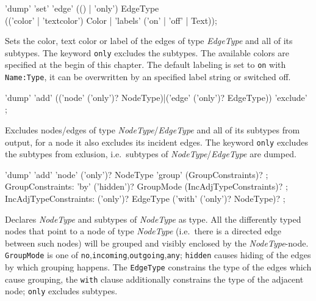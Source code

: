 \begin{rail}
  'dump' 'set' 'edge' (() | 'only') EdgeType \\ (('color' | 'textcolor') Color | 'labels' ('on' | 'off' | Text));
\end{rail}
Sets the color, text color or label of the edges of type \emph{EdgeType} and all of its subtypes.
The keyword \texttt{only} excludes the subtypes. The available colors are specified at the begin of this chapter.
The default labeling is set to \texttt{on} with \texttt{Name:Type}, it can be overwritten by an specified label string or switched off.

\begin{rail}
  'dump' 'add' (('node' ('only')? NodeType)|('edge' ('only')? EdgeType)) 'exclude' ;
\end{rail}
Excludes nodes/edges of type \emph{NodeType}/\emph{EdgeType} and all of its subtypes from output, for a node it also excludes its incident edges.
The keyword \texttt{only} excludes the subtypes from exlusion, i.e.\ subtypes of \emph{NodeType}/\emph{EdgeType} are dumped.

\begin{rail}
  'dump' 'add' 'node' ('only')? NodeType 'group' (GroupConstraints)? ;
GroupConstraints:
  'by' ('hidden')? GroupMode (IncAdjTypeConstraints)? ;
IncAdjTypeConstraints:
  ('only')? EdgeType ('with' ('only')? NodeType)? ;
\end{rail}
Declares \emph{NodeType} and subtypes of \emph{NodeType} as  type.
All the differently typed nodes that point to a node of type \emph{NodeType} 
(i.e.\ there is a directed edge between such nodes) will be grouped and visibly enclosed by the \emph{NodeType}-node.
\texttt{GroupMode} is one of \texttt{no},\texttt{incoming},\texttt{outgoing},\texttt{any}; \texttt{hidden} causes hiding of the edges by which grouping happens.
The \texttt{EdgeType} constrains the type of the edges which cause grouping, the \texttt{with} clause additionally constrains the type of the adjacent node; 
\texttt{only} excludes subtypes.

